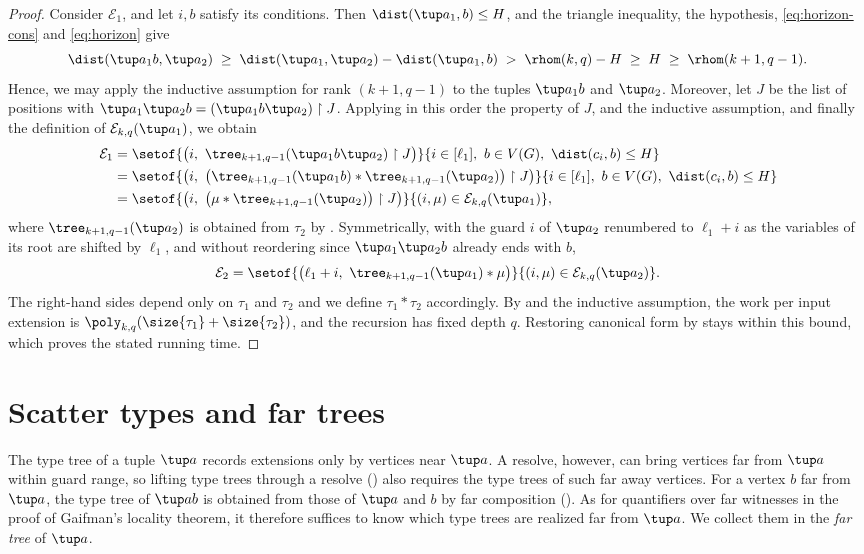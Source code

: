 \begin{proof}
Consider $\mathcal E_1$, and let $i,b$ satisfy its conditions.
Then $\dist(\tup a_1,b)\le H$, and the triangle inequality, the hypothesis, \eqref{eq:horizon-cons} and \eqref{eq:horizon} give
\[
\dist(\tup a_1b,\tup a_2)
\;\ge\;\dist(\tup a_1,\tup a_2)-\dist(\tup a_1,b)
\;>\;\rhom(k,q)-H
\;\ge\;H
\;\ge\;\rhom(k+1,q-1).
\]
Hence, we may apply the inductive assumption for rank $(k+1,q-1)$ to the tuples $\tup a_1b$ and $\tup a_2$.
Moreover, let $J$ be the list of positions with $\tup a_1\tup a_2 b=(\tup a_1 b\tup a_2)\restriction J$.
Applying in this order the property of \(J\),  and the inductive assumption, and finally the definition of $\mathcal E_{k,q}(\tup a_1)$, we obtain
\begin{align*}
\mathcal E_1
&=\setof{\bigl(i,\ \tree_{k+1,q-1}(\tup a_1 b\tup a_2)\restriction J\bigr)}{i\in[\ell_1],\ b\in V(G),\ \dist(c_i,b)\le H}\\
&=\setof{\bigl(i,\ \bigl(\tree_{k+1,q-1}(\tup a_1b)\ast\tree_{k+1,q-1}(\tup a_2)\bigr)\restriction J\bigr)}{i\in[\ell_1],\ b\in V(G),\ \dist(c_i,b)\le H}\\
&=\setof{\bigl(i,\ \bigl(\mu\ast\tree_{k+1,q-1}(\tup a_2)\bigr)\restriction J\bigr)}{(i,\mu)\in\mathcal E_{k,q}(\tup a_1)},
\end{align*}
where $\tree_{k+1,q-1}(\tup a_2)$ is obtained from $\tau_2$ by .
Symmetrically, with the guard $i$ of $\tup a_2$ renumbered to $\ell_1+i$ as the variables of its root are shifted by $\ell_1$, and without reordering since $\tup a_1\tup a_2 b$ already ends with $b$,
\[
\mathcal E_2
=\setof{\bigl(\ell_1+i,\ \tree_{k+1,q-1}(\tup a_1)\ast\mu\bigr)}{(i,\mu)\in\mathcal E_{k,q}(\tup a_2)}.
\]
The right-hand sides depend only on $\tau_1$ and $\tau_2$ and we define $\tau_1\ast\tau_2$ accordingly.
By  and the inductive assumption, the work per input extension is $\poly_{k,q}(\size {\tau_1}+\size{\tau_2})$, and the recursion has fixed depth $q$. Restoring canonical form by  stays within this bound, which proves the stated running time.
\end{proof}

\section{Scatter types and far trees}\label{sec:localglobal}

The type tree of a tuple $\tup a$ records extensions only by vertices near $\tup a$.
A resolve, however, can bring vertices far from $\tup a$ within guard range, so lifting type trees through a resolve () also requires the type trees of such far away vertices.
For a vertex $b$ far from $\tup a$, the type tree of $\tup ab$ is obtained from those of $\tup a$ and $b$ by far composition ().
As for quantifiers over far witnesses in the proof of Gaifman's locality theorem, it therefore suffices to know which type trees are realized far from $\tup a$.
We collect them in the \emph{far tree} of $\tup a$.

